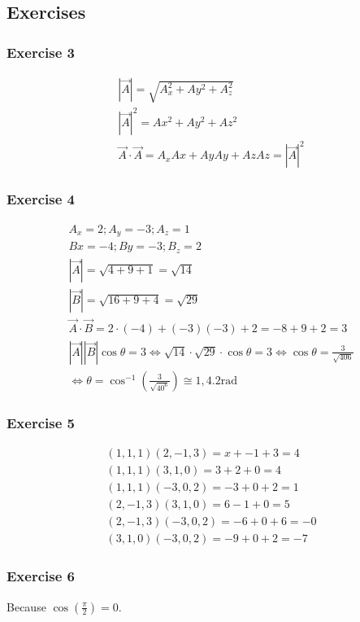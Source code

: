 \documentclass[../main.tex]{subfiles}
\begin{document}
\subsection{Exercises}

\subsubsection{Exercise 3}

\begin{equation}
\begin{array}{l}
|\vec{A}|=\sqrt{A_{x}^{2}+A y^{2}+A_{z}^{2}} \\
|\vec{A}|^{2}=A x^{2}+A y^{2}+A z^{2} \\
\vec{A} \cdot \vec{A}=A_{x} A x+A y A y+A z A z=|\vec{A}|^{2}
\end{array}
\end{equation}

\subsubsection{Exercise 4}

\begin{equation}
\begin{array}{l}
A_{x}=2 ; A_{y}=-3 ; A_{z}=1\\
B x=-4 ; B y=-3 ; B_{z}=2\\
|\vec{A}|=\sqrt{4+9+1}=\sqrt{14}\\
|\vec{B}|=\sqrt{16+9+4}=\sqrt{29}\\
\vec{A} \cdot \vec{B}=2 \cdot(-4)+(-3)(-3)+2=-8+9+2=3\\
|\vec{A}||\vec{B}| \cos \theta=3 \Leftrightarrow \sqrt{14} \cdot \sqrt{29} \cdot \cos \theta=3 \Leftrightarrow \cos \theta=\frac{3}{\sqrt{406}}\\
\Leftrightarrow \theta=\cos ^{-1}\left(\frac{3}{\sqrt{40^{6}}}\right) \cong 1,4.2 \mathrm{rad}
\end{array}
\end{equation}

\subsubsection{Exercise 5}

\begin{equation}
\begin{array}{l}
(1,1,1)(2,-1,3)=x+-1+3=4 \\
(1,1,1)(3,1,0)=3+2+0=4 \\
(1,1,1)(-3,0,2)=-3+0+2=1 \\
(2,-1,3)(3,1,0)=6-1+0=5 \\
(2,-1,3)(-3,0,2)=-6+0+6=-0 \\
(3,1,0)(-3,0,2)=-9+0+2=-7
\end{array}
\end{equation}

\subsubsection{Exercise 6}
Because $\cos(\frac{\pi}{2}) = 0$.
\end{document}
